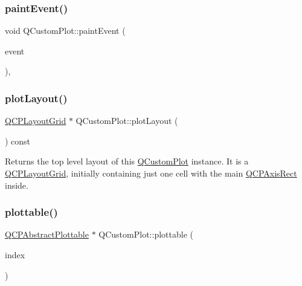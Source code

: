 \subsubsection{\texorpdfstring{paintEvent()}{paintEvent()}}
{\footnotesize\ttfamily void Q\+Custom\+Plot\+::paint\+Event (\begin{DoxyParamCaption}\item[{Q\+Paint\+Event $\ast$}]{event }\end{DoxyParamCaption})\hspace{0.3cm}{\ttfamily [protected]}, {\ttfamily [virtual]}}

\mbox{\label{class_q_custom_plot_af1a1f1f571237deb7c2bd34a5e9f018f}} 
\subsubsection{\texorpdfstring{plotLayout()}{plotLayout()}}
{\footnotesize\ttfamily \mbox{\hyperlink{class_q_c_p_layout_grid}{Q\+C\+P\+Layout\+Grid}} $\ast$ Q\+Custom\+Plot\+::plot\+Layout (\begin{DoxyParamCaption}{ }\end{DoxyParamCaption}) const\hspace{0.3cm}{\ttfamily [inline]}}

Returns the top level layout of this \mbox{\hyperlink{class_q_custom_plot}{Q\+Custom\+Plot}} instance. It is a \mbox{\hyperlink{class_q_c_p_layout_grid}{Q\+C\+P\+Layout\+Grid}}, initially containing just one cell with the main \mbox{\hyperlink{class_q_c_p_axis_rect}{Q\+C\+P\+Axis\+Rect}} inside. \mbox{\label{class_q_custom_plot_a32de81ff53e263e785b83b52ecd99d6f}} 
\subsubsection{\texorpdfstring{plottable()}{plottable()}\hspace{0.1cm}{\footnotesize\ttfamily [1/2]}}
{\footnotesize\ttfamily \mbox{\hyperlink{class_q_c_p_abstract_plottable}{Q\+C\+P\+Abstract\+Plottable}} $\ast$ Q\+Custom\+Plot\+::plottable (\begin{DoxyParamCaption}\item[{int}]{index }\end{DoxyParamCaption})}

